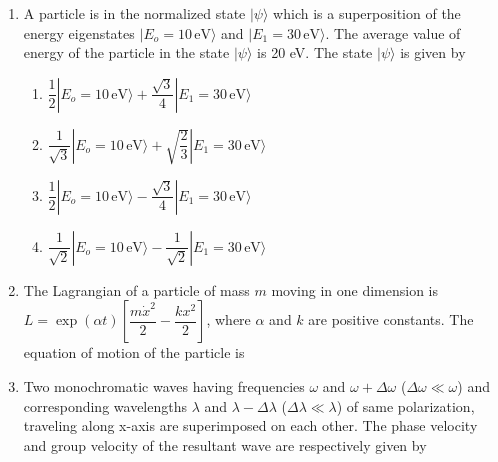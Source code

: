\documentclass[14pt, a4paper]{extarticle}
\begin{document}
\begin{enumerate}[label=\textbf{Q. \arabic*}, start=21]
\item A particle is in the normalized state $|\psi\rangle$ which is a superposition of the energy eigenstates $|E_o=10\,\text{eV}\rangle$ and $|E_1=30\,\text{eV}\rangle$. The average value of energy of the particle in the state $|\psi\rangle$ is 20 eV. The state $|\psi\rangle$ is given by
\begin{enumerate}
\item $\dfrac{1}{2}|E_o=10\,\text{eV}\rangle + \dfrac{\sqrt{3}}{4}|E_1=30\,\text{eV}\rangle$
\item $\dfrac{1}{\sqrt{3}}|E_o=10\,\text{eV}\rangle + \sqrt{\dfrac{2}{3}}|E_1=30\,\text{eV}\rangle$
\item $\dfrac{1}{2}|E_o=10\,\text{eV}\rangle - \dfrac{\sqrt{3}}{4}|E_1=30\,\text{eV}\rangle$
\item $\dfrac{1}{\sqrt{2}}|E_o=10\,\text{eV}\rangle - \dfrac{1}{\sqrt{2}}|E_1=30\,\text{eV}\rangle$
\end{enumerate}

\item The Lagrangian of a particle of mass $m$ moving in one dimension is $L = \exp(\alpha t) \left[ \dfrac{m\dot{x}^2}{2} - \dfrac{kx^2}{2} \right]$, where $\alpha$ and $k$ are positive constants. The equation of motion of the particle is
\begin{enumerate}
\end{enumerate}

\item Two monochromatic waves having frequencies $\omega$ and $\omega + \Delta\omega$ ($\Delta\omega \ll \omega$) and corresponding wavelengths $\lambda$ and $\lambda - \Delta\lambda$ ($\Delta\lambda \ll \lambda$) of same polarization, traveling along x-axis are superimposed on each other. The phase velocity and group velocity of the resultant wave are respectively given by
\begin{enumerate}
\end{enumerate}

\end{enumerate}
\end{document}
